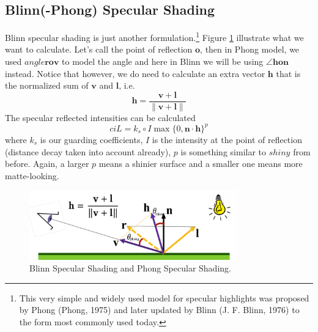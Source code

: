 \documentclass[11pt]{article}
\newcommand{\bh}{\mathbf{h}}
\newcommand{\bl}{\mathbf{l}}
\newcommand{\bn}{\mathbf{n}}
\newcommand{\bo}{\mathbf{o}}
\newcommand{\br}{\mathbf{r}}
\newcommand{\bv}{\mathbf{v}}
\begin{document}
\subsection{Blinn(-Phong) Specular Shading}
Blinn specular shading is just another formulation.\footnote{This very simple and widely used model for specular highlights was proposed by Phong (Phong, 1975) and later updated by Blinn (J. F. Blinn, 1976) to the form most commonly used today.} Figure \ref{blinn} illustrate what we want to calculate. Let's call the point of reflection $\bo$, then in Phong model, we used $angle\br\bo\bv$ to model the angle and here in Blinn we will be using $\angle\bh\bo\bn$ instead. Notice that however, we do need to calculate an extra vector $\bh$ that is the normalized sum of $\bv$ and $\bl$, i.e. 
\begin{equation}
	\mathbf{h}=\frac{\mathbf{v}+\bl}{\|\mathbf{v}+\bl\|}
\end{equation}
The specular reflected intensities can be calculated
\begin{equation}ci
	L = k_s \circ I \max \{ 0, \bn \cdot \bh \}^p
\end{equation}
where $k_s$ is our guarding coefficients, $I$ is the intensity at the point of reflection (distance decay taken into account already), $p$ is something similar to $shiny$ from before. Again, a larger $p$ means a shinier surface and  a smaller one means more matte-looking. 

\begin{figure}
	\centering\includegraphics[width=0.8\textwidth]{figs/blinn}
	\caption{\label{blinn} Blinn Specular Shading and Phong Specular Shading.}
\end{figure}
\end{document}
